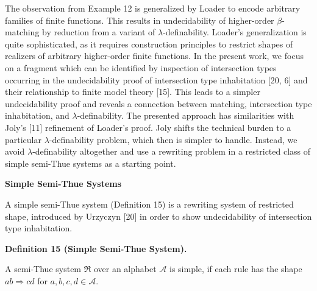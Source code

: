 \documentclass[10pt,a4paper]{amsart}
\begin{document}
The observation from Example 12 is generalized by Loader to encode arbitrary families of finite functions. This results in undecidability of higher-order $\beta$-matching by reduction from a variant of $\lambda$-definability. Loader’s generalization is quite sophisticated, as it requires construction principles to restrict shapes of realizers of arbitrary higher-order finite functions. In the present work, we focus on a fragment which can be identified by inspection of intersection types occurring in the undecidability proof of intersection type inhabitation [20, 6] and their relationship to finite model theory [15]. This leads to a simpler undecidability proof and reveals a connection between matching, intersection type inhabitation, and $\lambda$-definability. The presented approach has similarities with Joly’s [11] refinement of Loader’s proof. Joly shifts the technical burden to a particular $\lambda$-definability problem, which then is simpler to handle. Instead, we avoid $\lambda$-definability altogether and use a rewriting problem in a restricted class of simple semi-Thue systems as a starting point.\par
 
 
 
 
\par\medskip\noindent\textbf{Simple Semi-Thue Systems}\par
 
 
A simple semi-Thue system (Definition 15) is a rewriting system of restricted shape, introduced by Urzyczyn [20] in order to show undecidability of intersection type inhabitation.\par
 
 
 
\par\medskip\noindent\textbf{Definition 15 (Simple Semi-Thue System).}\par
 
 
A semi-Thue system $\mathfrak{R}$ over an alphabet $\mathcal{A}$ is simple, if each rule has the shape $ab\Rightarrow cd$ for $a,b,c,d\in\mathcal{A}$.\par
 
 
\end{document}
